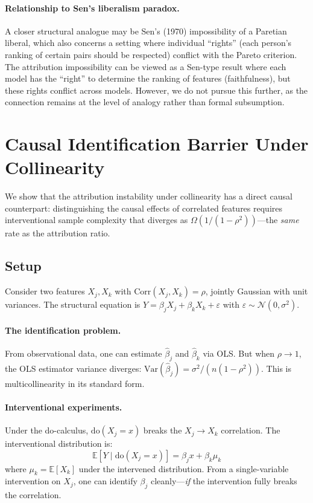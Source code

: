 \documentclass{article}
\newcommand{\Var}{\mathrm{Var}}
\begin{document}
\paragraph{Relationship to Sen's liberalism paradox.}
A closer structural analogue may be Sen's (1970) impossibility of a
Paretian liberal, which also concerns a setting where individual
``rights'' (each person's ranking of certain pairs should be
respected) conflict with the Pareto criterion. The attribution
impossibility can be viewed as a Sen-type result where each model
has the ``right'' to determine the ranking of features (faithfulness),
but these rights conflict across models.
However, we do not pursue this further, as the connection remains
at the level of analogy rather than formal subsumption.


\section{Causal Identification Barrier Under Collinearity}
\label{sec:causal-barrier}

We show that the attribution instability under collinearity has a
direct causal counterpart: distinguishing the causal effects of
correlated features requires interventional sample complexity that
diverges as $\Omega(1/(1-\rho^2))$---the \emph{same} rate as the
attribution ratio.

\subsection{Setup}

Consider two features $X_j, X_k$ with $\text{Corr}(X_j, X_k) = \rho$,
jointly Gaussian with unit variances. The structural equation is
$Y = \beta_j X_j + \beta_k X_k + \varepsilon$ with
$\varepsilon \sim \mathcal{N}(0, \sigma^2)$.

\paragraph{The identification problem.}
From observational data, one can estimate $\hat\beta_j$ and
$\hat\beta_k$ via OLS. But when $\rho \to 1$, the OLS estimator
variance diverges: $\Var(\hat\beta_j) = \sigma^2 / (n(1-\rho^2))$.
This is multicollinearity in its standard form.

\paragraph{Interventional experiments.}
Under the do-calculus, $\text{do}(X_j = x)$ breaks the
$X_j \to X_k$ correlation. The interventional distribution is:
\[
    \mathbb{E}[Y \mid \text{do}(X_j = x)] = \beta_j x + \beta_k \mu_k
\]
where $\mu_k = \mathbb{E}[X_k]$ under the intervened distribution.
From a single-variable intervention on $X_j$, one can identify
$\beta_j$ cleanly---\emph{if} the intervention fully breaks the
correlation.
\end{document}
